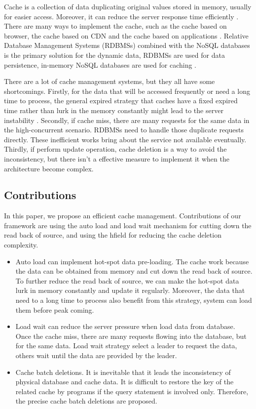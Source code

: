 \documentclass[conference]{IEEEtran}
\begin{document}
Cache is a collection of data duplicating original values stored in memory, usually for easier access. Moreover, it can reduce the server response time efficiently \cite{ma2017segment}. There are many ways to implement the cache, such as the cache based on browser, the cache based on CDN \cite{davis2013java} and the cache based on applications \cite{wu2011characterization}. Relative Database Management Systems (RDBMSs) combined with the NoSQL databases is the primary solution for the dynamic data, RDBMSs are used for data persistence, in-memory NoSQL databases are used for caching \cite{ma2017stream}.

There are a lot of cache management systems, but they all have some shortcomings. Firstly, for the data that will be accessed frequently or need a long time to process, the general expired strategy that caches have a fixed expired time rather than lurk in the memory constantly might lead to the server instability \cite{ma2017column}. Secondly, if cache miss, there are many requests for the same data in the high-concurrent scenario. RDBMSs need to handle those duplicate requests directly. These inefficient works bring about the service not available eventually. Thirdly, if perform update operation, cache deletion is a way to avoid the inconsistency, but there isn't a effective measure to implement it when the architecture become complex.

\subsection{Contributions}
In this paper, we propose an efficient cache management. Contributions of our framework are using the auto load and load wait mechanism for cutting down the read back of source, and using the hfield for reducing the cache deletion complexity.

\begin{itemize}
  \item Auto load can implement hot-spot data pre-loading. The cache work because the data can be obtained from memory and cut down the read back of source. To further reduce the read back of source, we can make the hot-spot data lurk in memory constantly and update it regularly. Moreover, the data that need to a long time to process also benefit from this strategy, system can load them before peak coming.
  \item Load wait can reduce the server pressure when load data from database. Once the cache miss, there are many requests flowing into the database, but for the same data. Load wait strategy select a leader to request the data, others wait until the data are provided by the leader.
  \item Cache batch deletions. It is inevitable that it leads the inconsistency of physical database and cache data. It is difficult to restore the key of the related cache by programs if the query statement is involved only. Therefore, the precise cache batch deletions are proposed.
\end{itemize}
\end{document}

